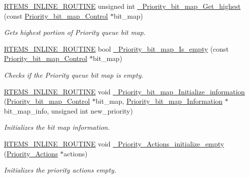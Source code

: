 \begin{DoxyCompactItemize}
\mbox{\hyperlink{group__RTEMSScoreBaseDefs_gac216239df231d5dbd15e3520b0b9313f}{R\+T\+E\+M\+S\+\_\+\+I\+N\+L\+I\+N\+E\+\_\+\+R\+O\+U\+T\+I\+NE}} unsigned int \mbox{\hyperlink{group__RTEMSScorePriority_ga1f62e66dfe278e0aa74677bcb444d4bf}{\+\_\+\+Priority\+\_\+bit\+\_\+map\+\_\+\+Get\+\_\+highest}} (const \mbox{\hyperlink{structPriority__bit__map__Control}{Priority\+\_\+bit\+\_\+map\+\_\+\+Control}} $\ast$bit\+\_\+map)
\begin{DoxyCompactList}\small\item\em Gets highest portion of Priority queue bit map. \end{DoxyCompactList}\item 
\mbox{\hyperlink{group__RTEMSScoreBaseDefs_gac216239df231d5dbd15e3520b0b9313f}{R\+T\+E\+M\+S\+\_\+\+I\+N\+L\+I\+N\+E\+\_\+\+R\+O\+U\+T\+I\+NE}} bool \mbox{\hyperlink{group__RTEMSScorePriority_ga957c4e569087b83bf77d27e03e121606}{\+\_\+\+Priority\+\_\+bit\+\_\+map\+\_\+\+Is\+\_\+empty}} (const \mbox{\hyperlink{structPriority__bit__map__Control}{Priority\+\_\+bit\+\_\+map\+\_\+\+Control}} $\ast$bit\+\_\+map)
\begin{DoxyCompactList}\small\item\em Checks if the Priority queue bit map is empty. \end{DoxyCompactList}\item 
\mbox{\hyperlink{group__RTEMSScoreBaseDefs_gac216239df231d5dbd15e3520b0b9313f}{R\+T\+E\+M\+S\+\_\+\+I\+N\+L\+I\+N\+E\+\_\+\+R\+O\+U\+T\+I\+NE}} void \mbox{\hyperlink{group__RTEMSScorePriority_gab11e5706b0623eda6bb5a0c7f85f3a50}{\+\_\+\+Priority\+\_\+bit\+\_\+map\+\_\+\+Initialize\+\_\+information}} (\mbox{\hyperlink{structPriority__bit__map__Control}{Priority\+\_\+bit\+\_\+map\+\_\+\+Control}} $\ast$bit\+\_\+map, \mbox{\hyperlink{structPriority__bit__map__Information}{Priority\+\_\+bit\+\_\+map\+\_\+\+Information}} $\ast$bit\+\_\+map\+\_\+info, unsigned int new\+\_\+priority)
\begin{DoxyCompactList}\small\item\em Initializes the bit map information. \end{DoxyCompactList}\item 
\mbox{\hyperlink{group__RTEMSScoreBaseDefs_gac216239df231d5dbd15e3520b0b9313f}{R\+T\+E\+M\+S\+\_\+\+I\+N\+L\+I\+N\+E\+\_\+\+R\+O\+U\+T\+I\+NE}} void \mbox{\hyperlink{group__RTEMSScorePriority_ga7bc66b35e181e6b877defc90ec74c893}{\+\_\+\+Priority\+\_\+\+Actions\+\_\+initialize\+\_\+empty}} (\mbox{\hyperlink{structPriority__Actions}{Priority\+\_\+\+Actions}} $\ast$actions)
\begin{DoxyCompactList}\small\item\em Initializes the priority actions empty. \end{DoxyCompactList}\item 

\end{DoxyCompactItemize}
